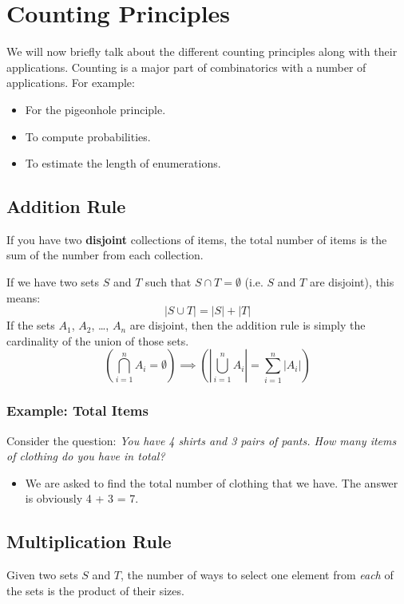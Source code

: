 \documentclass[letterpaper]{article}
\begin{document}
\newpage 
\section{Counting Principles}
We will now briefly talk about the different counting principles along with their applications. Counting is a major part of combinatorics with a number of applications. For example:
\begin{itemize}
    \item For the pigeonhole principle.
    \item To compute probabilities. 
    \item To estimate the length of enumerations. 
\end{itemize}


\subsection{Addition Rule}
If you have two \textbf{disjoint} collections of items, the total number of items is the sum of the number from each collection.

\bigskip 

If we have two sets $S$ and $T$ such that $S \cap T = \emptyset$ (i.e. $S$ and $T$ are disjoint), this means:
\[|S \cup T| = |S| + |T|\]
If the sets $A_1$, $A_2$, \dots, $A_n$ are disjoint, then the addition rule is simply the cardinality of the union of those sets. 
\[\left(\bigcap_{i = 1}^n A_i = \emptyset\right) \implies \left(\left| \bigcup_{i = 1}^n A_i \right| = \sum_{i = 1}^n |A_i|\right)\]

\subsubsection{Example: Total Items}
Consider the question: \emph{You have 4 shirts and 3 pairs of pants. How many items of clothing do you have in total?} 
\begin{itemize}
    \item We are asked to find the total number of clothing that we have. The answer is obviously 4 + 3 = 7.
\end{itemize}

\subsection{Multiplication Rule}
Given two sets $S$ and $T$, the number of ways to select one element from \emph{each} of the sets is the product of their sizes.
\end{document}
